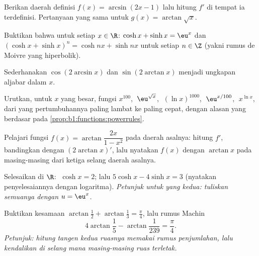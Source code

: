 \begin{exercise}[$\star$]\label{exo:b1:functions:2}
Berikan daerah definisi $f(x) = \arcsin(2x - 1)$ lalu hitung
$f'$ di tempat ia terdefinisi. Pertanyaan yang sama untuk $g(x) = \arctan\sqrt{x}$.
\end{exercise}

\begin{exercise}[$\star$]\label{exo:b1:functions:3}
Buktikan bahwa untuk setiap $x \in \R$: $\cosh x + \sinh x = \eu^x$ dan
$(\cosh x + \sinh x)^n = \cosh nx + \sinh nx$ untuk setiap $n \in \Z$
(yakni rumus de Moivre yang hiperbolik).
\end{exercise}

\begin{exercise}[$\star$]\label{exo:b1:functions:4}
Sederhanakan $\cos(2\arcsin x)$ dan $\sin(2\arctan x)$ menjadi ungkapan
aljabar dalam $x$.
\end{exercise}

\begin{exercise}[$\star$]\label{exo:b1:functions:5}
Urutkan, untuk $x$ yang besar, fungsi
$x^{100}$, $\;\eu^{\sqrt x}$, $\;(\ln x)^{1000}$, $\;\eu^{x/100}$,
$\;x^{\ln x}$, dari yang pertumbuhannya paling lambat ke paling cepat, dengan alasan
yang berdasar pada \cref{prop:b1:functions:powerrules}.
\end{exercise}

\begin{exercise}[$\star\star$]\label{exo:b1:functions:6}
Pelajari fungsi $f(x) = \arctan\dfrac{2x}{1 - x^2}$ pada daerah asalnya:
hitung $f'$, bandingkan dengan $(2\arctan x)'$, lalu nyatakan $f(x)$
dengan $\arctan x$ pada masing-masing dari ketiga selang daerah asalnya.
\end{exercise}

\begin{exercise}[$\star\star$]\label{exo:b1:functions:7}
Selesaikan di $\R$: $\;\cosh x = 2$; lalu $5\cosh x - 4 \sinh x = 3$
(nyatakan penyelesaiannya dengan logaritma). \emph{Petunjuk untuk yang kedua:
tuliskan semuanya dengan $u = \eu^x$.}
\end{exercise}

\begin{exercise}[$\star\star$]\label{exo:b1:functions:8}
Buktikan kesamaan $\arctan\frac{1}{2} + \arctan\frac{1}{3} =
\frac{\pi}{4}$, lalu rumus Machin
\[
4\arctan\frac 15 - \arctan\frac{1}{239} = \frac{\pi}{4}.
\]
\emph{Petunjuk: hitung tangen kedua ruasnya memakai rumus
penjumlahan, lalu kendalikan di selang mana masing-masing ruas terletak.}
\end{exercise}

